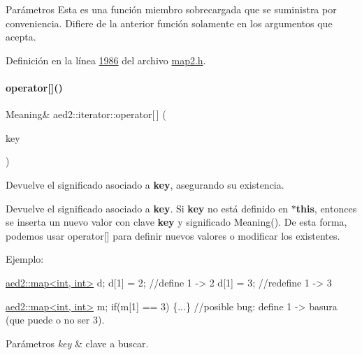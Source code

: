 \begin{DoxyParams}{\-Parámetros}
Esta es una función miembro sobrecargada que se suministra por conveniencia. Difiere de la anterior función solamente en los argumentos que acepta. 

Definición en la línea \hyperlink{map2_8h_source_l01986}{1986} del archivo \hyperlink{map2_8h_source}{map2.\+h}.

\mbox{\label{classaed2_1_1iterator_af74d214f3278d8cd6b3a5a721e173fa3_af74d214f3278d8cd6b3a5a721e173fa3}} 
\paragraph{\texorpdfstring{operator[]()}{operator[]()}}
{\footnotesize\ttfamily Meaning\& aed2\+::iterator\+::operator\mbox{[}$\,$\mbox{]} (\begin{DoxyParamCaption}\item[{const Key \&}]{key }\end{DoxyParamCaption})\hspace{0.3cm}{\ttfamily [inline]}}



Devuelve el significado asociado a {\bfseries key}, asegurando su existencia. 

Devuelve el significado asociado a {\bfseries key}. Si {\bfseries key} no está definido en {\bfseries $\ast$this}, entonces se inserta un nuevo valor con clave {\bfseries key} y significado Meaning(). De esta forma, podemos usar {\ttfamily operator\mbox{[}\mbox{]}} para definir nuevos valores o modificar los existentes.

Ejemplo\+: 
\begin{DoxyCode}
\hyperlink{classaed2_1_1map}{aed2::map<int, int>} d;
d[1] = 2;      \textcolor{comment}{//define 1 -> 2}
d[1] = 3;      \textcolor{comment}{//redefine 1 -> 3}

\hyperlink{classaed2_1_1map}{aed2::map<int, int>} m;
\textcolor{keywordflow}{if}(m[1] == 3) \{...\} \textcolor{comment}{//posible bug: define 1 -> basura (que puede o no ser 3).}
\end{DoxyCode}



\begin{DoxyParams}{Parámetros}
{\em key} & clave a buscar. \\
\hline
\end{DoxyParams}


\end{DoxyParams}
